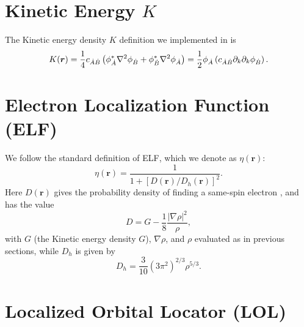 \section{Kinetic Energy $K$}

The Kinetic energy density $K$ definition we implemented in \DTK{} is
%
\begin{equation}
   K(\boldsymbol{r})=\frac{1}{4}c_{\dot{A}\dot{B}}\left(\phi_{\dot{A}}^*\nabla^2\phi_{\dot{B}}+\phi_{\dot{B}}^*\nabla^2\phi_{\dot{A}}\right)=\frac{1}{2}\phi_{\dot{A}}\left(c_{\dot{A}\dot{B}}\partial_k\partial_k\phi_{\dot{B}}\right).
\end{equation}
%

\section{Electron Localization Function (ELF)}

We follow the standard definition of ELF, which we denote as $\eta(\boldsymbol{r})$:
%
\begin{equation}
   \eta(\boldsymbol{r})=\frac{1}{1+[D(\boldsymbol{r})/D_h(\boldsymbol{r})]^2}.
\end{equation}
%
Here $D(\boldsymbol{r})$ gives the probability density of finding a same-spin electron \cite{bib:becke1990}, and has the value
%
\begin{equation}
   D=G-\frac{1}{8}\frac{|\nabla\rho|^2}{\rho},
\end{equation}
%
with $G$ (the Kinetic energy density $G$), $\nabla\rho$, and $\rho$ evaluated as in previous sections, while $D_h$ is given by
%
\begin{equation}
   D_h=\frac{3}{10}(3\pi^2)^{2/3}\rho^{5/3}.
\end{equation}
%

\section{Localized Orbital Locator (LOL)}

